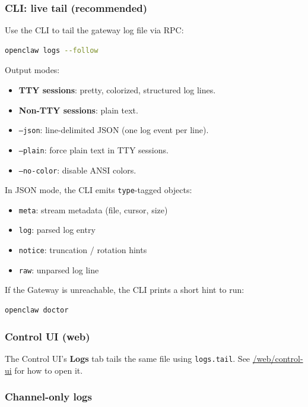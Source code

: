 \subsubsection{CLI: live tail (recommended)}


Use the CLI to tail the gateway log file via RPC:

\begin{lstlisting}[language=bash]
openclaw logs --follow
\end{lstlisting}


Output modes:

\begin{itemize}
  \item \textbf{TTY sessions}: pretty, colorized, structured log lines.
  \item \textbf{Non-TTY sessions}: plain text.
  \item \texttt{--json}: line-delimited JSON (one log event per line).
  \item \texttt{--plain}: force plain text in TTY sessions.
  \item \texttt{--no-color}: disable ANSI colors.
\end{itemize}


In JSON mode, the CLI emits \texttt{type}-tagged objects:

\begin{itemize}
  \item \texttt{meta}: stream metadata (file, cursor, size)
  \item \texttt{log}: parsed log entry
  \item \texttt{notice}: truncation / rotation hints
  \item \texttt{raw}: unparsed log line
\end{itemize}


If the Gateway is unreachable, the CLI prints a short hint to run:

\begin{lstlisting}[language=bash]
openclaw doctor
\end{lstlisting}


\subsubsection{Control UI (web)}


The Control UI’s \textbf{Logs} tab tails the same file using \texttt{logs.tail}.
See \href{/web/control-ui}{/web/control-ui} for how to open it.

\subsubsection{Channel-only logs}


